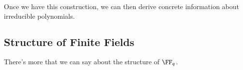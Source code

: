  
     
     

Once we have this construction, we can then derive concrete information about irreducible polynomials. 

\subsection{Structure of Finite Fields}

There's more that we can say about the structure of $\FF_q$. 
 
